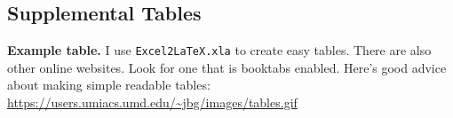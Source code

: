 \subsection*{Supplemental Tables}
\setcounter{table}{0} %
\renewcommand{\thetable}{S\arabic{table}} %


    {\textbf{\color{sectioncolor}\normalsize Example table.}} %
    {I use \texttt{Excel2LaTeX.xla} to create easy tables. There are also other online websites. Look for one that is booktabs enabled. Here's good advice about making simple readable tables: \url{https://users.umiacs.umd.edu/~jbg/images/tables.gif}} %
\sampleTable



\clearpage